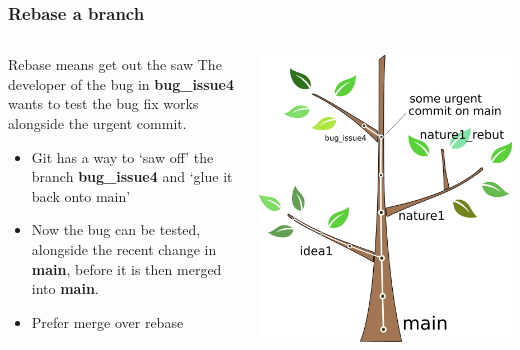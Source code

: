 \documentclass{beamer}
\begin{document}
\begin{frame}
  \frametitle{Rebase a branch}
  \begin{columns}[T]
    \begin{column}{.5\textwidth}
      \begin{block}{Rebase means get out the saw}
        The developer of the bug in \textbf{bug\_issue4} wants to test the bug
        fix works alongside the urgent commit.
        \begin{itemize}
          \item Git has a way to `saw off' the branch  \textbf{bug\_issue4}
            and `glue it back onto main'
          \item Now the bug can be tested, alongside the recent change in
            \textbf{main}, before it is then merged into \textbf{main}.
            \item Prefer merge over rebase
        \end{itemize}
      \end{block}
    \end{column}
    \begin{column}{.5\textwidth}
      \includegraphics[width=\textwidth]{tree_rebase3.png}
    \end{column}
  \end{columns}
\end{frame}
\end{document}
